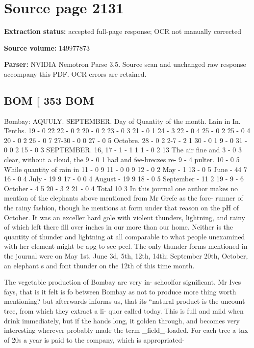 \clearpage
\section{Source page 2131}
\textbf{Extraction status:} accepted full-page response; OCR not manually corrected\par
\textbf{Source volume:} 149977873\par
\textbf{Parser:} NVIDIA Nemotron Parse 3.5. Source scan and unchanged raw response accompany this PDF. OCR errors are retained.\par\medskip
\subsection*{BOM [ 353 BOM}
Bombay: AQUULY.
SEPTEMBER.
Day of Quantity of the month.
Lain in In. Tenths.
19 - 0 22 22 - 0 2
20 - 0 2 23 - 0 3
21 - 0 1 24 - 3
22 - 0 4 25 - 0 2
25 - 0 4 20 - 0 2
26 - 0 7 27-30 - 0 0
27 - 0 5 Octobre.
28 - 0 2 2-7 - 2 1
30 - 0 1 9 - 0
31 - 0 0 2 15 - 0 3
SEPTEMBER. 16, 17 - 1 - 1 1
1 - 0 2 13 The air fine and
3 - 0 3
clear, without a cloud, the
9 - 0 1
had and fee-breczes re-
9 - 4 pulter.
10 - 0 5 While quantity of rain in
11 - 0 9
11 - 0 0 9
12 - 0 2 May - 1
13 - 0 5 June - 44 7
16 - 0 4 July - 19 9
17 - 0 0 4 August - 19 9
18 - 0 5 September - 11 2
19 - 9 - 6 October - 4 5
20 - 3 2
21 - 0 4 Total 10 3
In this journal one author makes no mention of the
elephants above mentioned from Mr Grefe as the fore-
runner of the rainy fashion, though he mentions at form
under that reason on the pH of October. It was an
exceller hard gole with violent thunders, lightning,
and rainy of which left there fill over inches in our
more than our home. Neither is the quantity of
thunder and lightning at all comparable to what people
unexamined with her element might be apg to see
peel. The only thunder-forms mentioned in the
journal were on May 1st. June 3d, 5th, 12th, 14th;
September 20th, October, an elephant s and font
thunder on the 12th of this time month.\par\medskip
The vegetable production of Bombay are very in-
schoolfor significant. Mr Ives fays, that is it felt is fo between
Bombay as not to produce more thing worth mentioning?
but afterwards informs us, that its “natural product
is the uncount tree, from which they extract a li-
quor called today. This is full and mild when drink
immediately, but if the hands long, it golden through,
and becomes very interesting wherever probably made
the term \_field\_-loaded. For each tree a tax of 20s
a year is paid to the company, which is appropriated-
